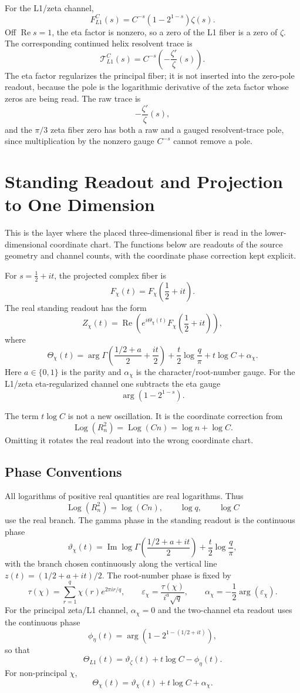 \documentclass[11pt]{article}
\DeclareMathOperator{\Ree}{Re}
\DeclareMathOperator{\Imm}{Im}
\DeclareMathOperator{\argg}{arg}
\DeclareMathOperator{\Log}{Log}
\begin{document}
For the L1/zeta channel,
\[
  F_{L1}^C(s)=C^{-s}(1-2^{1-s})\zeta(s).
\]
Off $\Ree s=1$, the eta factor is nonzero, so a zero of the L1 fiber is a zero
of $\zeta$.  The corresponding continued helix resolvent trace is
\[
  \mathcal T_{L1}^C(s)
  =
  C^{-s}\left(-\frac{\zeta'}{\zeta}(s)\right).
\]
The eta factor regularizes the principal fiber; it is not inserted into the
zero-pole readout, because the pole is the logarithmic derivative of the zeta
factor whose zeros are being read.  The raw trace is
\[
  -\frac{\zeta'}{\zeta}(s),
\]
and the $\pi/3$ zeta fiber zero has both a raw and a gauged resolvent-trace
pole, since multiplication by the nonzero gauge $C^{-s}$ cannot remove a pole.

\section{Standing Readout and Projection to One Dimension}

This is the layer where the placed three-dimensional fiber is read in the
lower-dimensional coordinate chart.  The functions below are readouts of the
source geometry and channel counts, with the coordinate phase correction kept
explicit.

For $s=\frac12+it$, the projected complex fiber is
\[
  F_\chi(t)=F_\chi\!\left(\frac12+it\right).
\]
The real standing readout has the form
\[
  Z_\chi(t)
  =
  \Ree\left(
    e^{i\Theta_\chi(t)}
    F_\chi\!\left(\frac12+it\right)
  \right),
\]
where
\[
  \Theta_\chi(t)
  =
  \argg\Gamma\!\left(\frac{1/2+a}{2}+\frac{it}{2}\right)
  +\frac t2\log\frac q\pi
  +t\log C
  +\alpha_\chi .
\]
Here $a\in\{0,1\}$ is the parity and $\alpha_\chi$ is the character/root-number gauge.
For the L1/zeta eta-regularized channel one subtracts the eta gauge
\[
  \argg(1-2^{1-s}).
\]

The term $t\log C$ is not a new oscillation.  It is the coordinate correction from
\[
  \Log(R_n^2)=\Log(Cn)=\log n+\log C.
\]
Omitting it rotates the real readout into the wrong coordinate chart.

\subsection{Phase Conventions}

All logarithms of positive real quantities are real logarithms.  Thus
\[
  \Log(R_n^2)=\log(Cn),\qquad
  \log q,\qquad \log C
\]
use the real branch.  The gamma phase in the standing readout is the continuous
phase
\[
  \vartheta_{\chi}(t)
  =
  \Imm\log\Gamma\!\left(\frac{1/2+a+it}{2}\right)
  +\frac t2\log\frac q\pi ,
\]
with the branch chosen continuously along the vertical line
$z(t)=(1/2+a+it)/2$.  The root-number phase is fixed by
\[
  \tau(\chi)=\sum_{r=1}^{q}\chi(r)e^{2\pi i r/q},\qquad
  \varepsilon_\chi=\frac{\tau(\chi)}{i^a\sqrt q},\qquad
  \alpha_\chi=-\frac12\argg(\varepsilon_\chi).
\]
For the principal zeta/L1 channel, $\alpha_\chi=0$ and the two-channel
eta readout uses the continuous phase
\[
  \phi_\eta(t)
  =
  \argg\!\left(1-2^{1-(1/2+it)}\right),
\]
so that
\[
  \Theta_{L1}(t)
  =
  \vartheta_\zeta(t)+t\log C-\phi_\eta(t).
\]
For non-principal $\chi$,
\[
  \Theta_\chi(t)=\vartheta_\chi(t)+t\log C+\alpha_\chi.
\]
\end{document}
